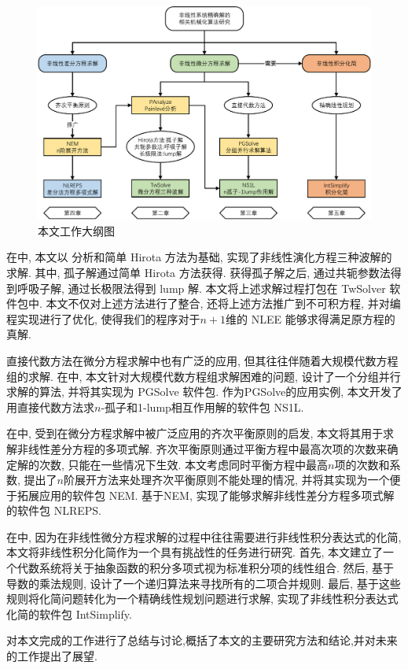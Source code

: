 \begin{figure}[htbp]
\includegraphics[width=\textwidth]{fig/outline.pdf}
\caption{本文工作大纲图}\label{outline}
\end{figure}

在中, 本文以 \Painleve{} 分析和简单 Hirota 方法为基础, 实现了非线性演化方程三种波解的求解. 其中, 孤子解通过简单 Hirota 方法获得. 获得孤子解之后, 通过共轭参数法得到呼吸子解, 通过长极限法得到 lump 解. 本文将上述求解过程打包在 TwSolver 软件包中. 本文不仅对上述方法进行了整合, 还将上述方法推广到不可积方程, 并对编程实现进行了优化, 使得我们的程序对于$n+1$维的 NLEE 能够求得满足原方程的真解. 

直接代数方法在微分方程求解中也有广泛的应用, 但其往往伴随着大规模代数方程组的求解. 在中, 本文针对大规模代数方程组求解困难的问题, 设计了一个分组并行求解的算法, 并将其实现为 PGSolve 软件包. 作为PGSolve的应用实例, 本文开发了用直接代数方法求$n$-孤子和1-lump相互作用解的软件包 NS1L. 

在中, 受到在微分方程求解中被广泛应用的齐次平衡原则的启发, 本文将其用于求解非线性差分方程的多项式解. 齐次平衡原则通过平衡方程中最高次项的次数来确定解的次数, 只能在一些情况下生效. 本文考虑同时平衡方程中最高$n$项的次数和系数, 提出了$n$阶展开方法来处理齐次平衡原则不能处理的情况, 并将其实现为一个便于拓展应用的软件包 NEM. 基于NEM, 实现了能够求解非线性差分方程多项式解的软件包 NLREPS. 


在中, 因为在非线性微分方程求解的过程中往往需要进行非线性积分表达式的化简, 本文将非线性积分化简作为一个具有挑战性的任务进行研究. 首先, 本文建立了一个代数系统将关于抽象函数的积分多项式视为标准积分项的线性组合. 然后, 基于导数的乘法规则, 设计了一个递归算法来寻找所有的二项合并规则. 最后, 基于这些规则将化简问题转化为一个精确线性规划问题进行求解, 实现了非线性积分表达式化简的软件包 IntSimplify. 

对本文完成的工作进行了总结与讨论,概括了本文的主要研究方法和结论,并对未来的工作提出了展望.
